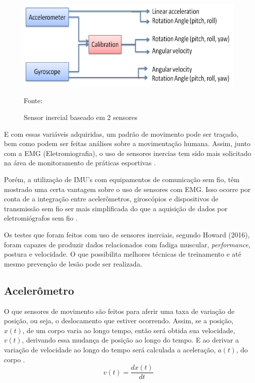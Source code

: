 		\begin{figure}[h]
			\centering
			\includegraphics[keepaspectratio=true,scale=0.3
			]{figuras/integracao_imu.png}
			\caption{Sensor inercial baseado em 2 sensores}
			Fonte: \cite{ahmad2013}
			\label{integracao_imu}
			
		\end{figure}

		E com essas variáveis adquiridas, um padrão de movimento pode ser traçado, bem como podem ser feitas análises sobre a movimentação humana. Assim, junto com a EMG (Eletromiografia), o uso de sensores inercias tem sido mais solicitado na área de monitoramento de práticas esportivas \cite{howard2016}.
		
		Porém, a utilização de IMU's com equipamentos de comunicação sem fio, têm mostrado uma certa vantagem sobre o uso de sensores com EMG. Isso ocorre por conta de a integração entre acelerômetros, giroscópios e dispositivos de transmissão sem fio ser mais simplificada do que a aquisição de dados por eletromiógrafos sem fio \cite{howard2016}. 
		
		Os testes que foram feitos com uso de sensores inerciais, segundo  Howard (2016), foram capazes de produzir dados relacionados com fadiga muscular, \textit{performance}, postura e velocidade. O que possibilita melhores técnicas de treinamento e até mesmo prevenção de lesão pode ser realizada.

			\subsection{Acelerômetro}
			
				O que sensores de movimento são feitos para aferir uma taxa de variação de posição, ou seja, o deslocamento que estiver ocorrendo. Assim, se a posição, $x(t)$, de um corpo varia ao longo tempo, então será obtida sua velocidade, $v(t)$,  derivando essa mudança de posição ao longo do tempo. E ao derivar a variação de velocidade ao longo do tempo será calculada a aceleração, $a(t)$, do corpo \cite{moyses2013}.
				\begin{equation}
				v(t) = \frac{dx(t)}{dt}
				\end{equation}
				
